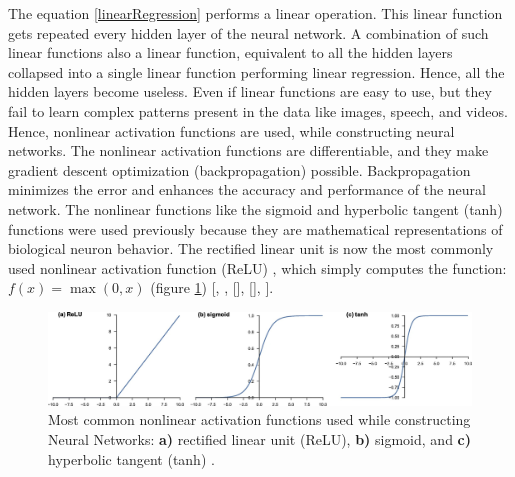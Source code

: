 The equation \ref{linearRegression} performs a linear operation. This linear function gets repeated every hidden layer of the neural network. A combination of such linear functions also a linear function, equivalent to all the hidden layers collapsed into a single linear function performing linear regression. Hence, all the hidden layers become useless. Even if linear functions are easy to use, but they fail to learn complex patterns present in the data like images, speech, and videos. Hence, nonlinear activation functions are used, while constructing neural networks. The nonlinear activation functions are differentiable, and they make gradient descent optimization (backpropagation) possible. Backpropagation minimizes the error and enhances the accuracy and performance of the neural network. The nonlinear functions like the sigmoid and hyperbolic tangent (tanh) functions were used previously because they are mathematical representations of biological neuron behavior. The rectified linear unit is now the most commonly used nonlinear activation function (ReLU) , which simply computes the function: $f(x) = \max(0, x)$ (figure \ref{fig:ActivationFunctions}) [\cite{LeCun.2015}, \cite{NIPS2012_c399862d}, [\cite{10.5555/3104322.3104425}], [\cite{ramachandran2017searching}], \cite{pmlr-v15-glorot11a}].

\vspace*{0.5cm}

\begin{figure}[H]
        \begin{center}
	    \includegraphics[scale=0.42]{images/Fundamentals/ActivationFunctions.jpg}
	    \caption[Most common nonlinear activation functions used while constructing Neural Networks.]{Most common nonlinear activation functions used while constructing Neural Networks: \textbf{a)} rectified linear unit (ReLU), \textbf{b)} sigmoid, and \textbf{c)} hyperbolic tangent (tanh) \cite{articleCNNs}.}
	    \label{fig:ActivationFunctions}
	    \end{center}
\end{figure}

